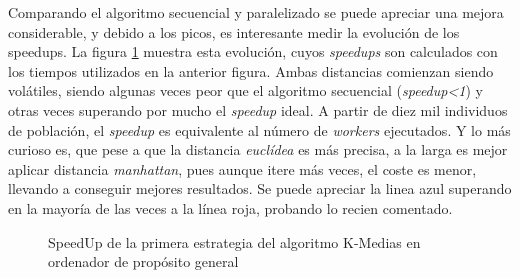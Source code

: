 			
			Comparando el algoritmo secuencial y paralelizado se puede apreciar una mejora considerable, y debido a los picos, es interesante medir la evolución de los speedups. La figura \ref{fig:Kmedias_speedup} muestra esta evolución, cuyos \textit{speedups} son calculados con los tiempos utilizados en la anterior figura. Ambas distancias comienzan siendo volátiles, siendo algunas veces peor que el algoritmo secuencial (\textit{speedup<1}) y otras veces superando por mucho el \textit{speedup} ideal. A partir de diez mil individuos de población, el \textit{speedup} es equivalente al número de \textit{workers} ejecutados. Y lo más curioso es,  que pese a que la distancia \textit{euclídea} es más precisa, a la larga es mejor aplicar distancia \textit{manhattan}, pues aunque itere más veces, el coste es menor, llevando a conseguir mejores resultados. Se puede apreciar la linea azul superando en la mayoría de las veces a la línea roja, probando lo recien comentado.
			
			
			
			
			\begin{figure}[!h]
			\centering
			\caption{SpeedUp de la primera estrategia del algoritmo K-Medias en ordenador de propósito general}
			\label{fig:Kmedias_speedup}
			\end{figure}
			
					
					
		
